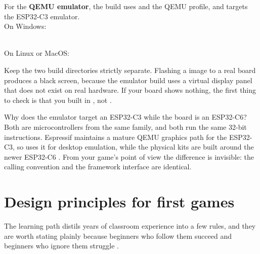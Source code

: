For the \textbf{QEMU emulator}, the build uses  and the QEMU
profile, and targets the ESP32\nobreakdash-C3 emulator. \\

On Windows:

 

\\ On Linux or MacOS:



\begin{prgwarn}
Keep the two build directories strictly separate. Flashing a 
image to a real board produces a black screen, because the emulator build uses a
virtual display panel that does not exist on real hardware. If your board shows
nothing, the first thing to check is that you built in , not
 \citep{prg32qemu}.
\end{prgwarn}

\begin{prgaside}
Why does the emulator target an ESP32\nobreakdash-C3 while the board is an ESP32\nobreakdash-C6? Both
are \riscv microcontrollers from the same family, and both run the same 32-bit
\riscv instructions. Espressif maintains a mature QEMU graphics path for the
ESP32\nobreakdash-C3, so \prg uses it for desktop emulation, while the physical kits are
built around the newer ESP32\nobreakdash-C6 \citep{prg32qemu}. From your game's point of
view the difference is invisible: the calling convention and the framework
interface are identical.
\end{prgaside}

\section{Design principles for first games}

The \prg learning path distils years of classroom experience into a few rules,
and they are worth stating plainly because beginners who follow them succeed and
beginners who ignore them struggle \citep{prg32repo,prg32tutorial}.

